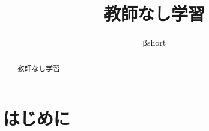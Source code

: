 \documentclass[uplatex, a4j]{jsarticle}
\title{教師なし学習}
\author{βshort}
\begin{document}
\maketitle

\begin{abstract}
  教師なし学習
\end{abstract}

\section{はじめに}
\end{document}
